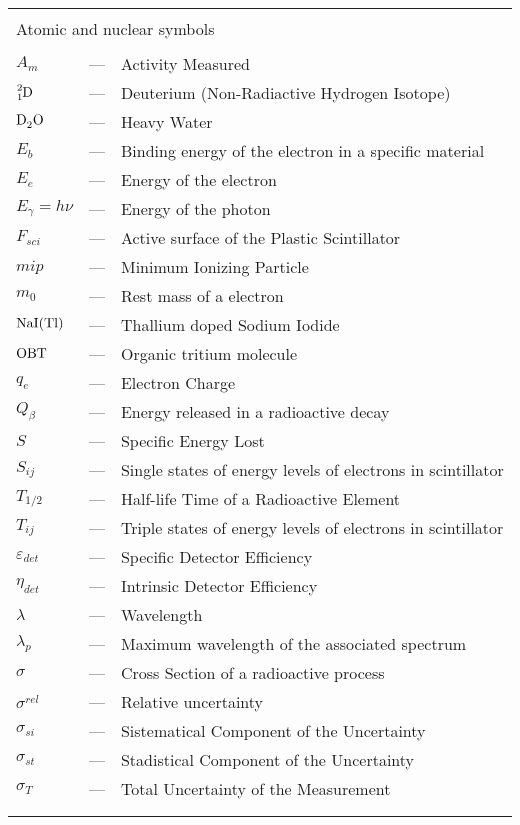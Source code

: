 \begin{longtable}{p{25mm} c p{120mm} }
\\
\\
\multicolumn{3}{l}{Atomic and nuclear symbols}\\
\\
$A_{m}$ & --- & Activity Measured\\
$\ce{^{2}_{1}D}$ & --- & Deuterium (Non-Radiactive Hydrogen Isotope)\\
$\ce{D_{2}O}$ & --- & Heavy Water\\
$E_b$ & --- & Binding energy of the electron in a specific material\\
$E_e$ & --- & Energy of the electron\\
$E_\gamma = h\nu$ & --- & Energy of the photon\\
$F_{sci}$ & --- & Active surface of the Plastic Scintillator\\
$mip$ & --- & Minimum Ionizing Particle\\
$m_0$ & --- & Rest mass of a electron\\
$\ce{NaI(Tl)}$ & --- & Thallium doped Sodium Iodide\\
$\ce{OBT}$ & --- & Organic tritium molecule\\
$q_{e}$ & --- & Electron Charge\\
$Q_\beta$ & --- & Energy released in a radioactive decay\\
$S$ & --- & Specific Energy Lost\\
$S_{ij}$ & --- & Single states of energy levels of electrons in scintillator\\
$T_{1/2}$ & --- & Half-life Time of a Radioactive Element\\
$T_{ij}$ & --- & Triple states of energy levels of electrons in scintillator\\
$\varepsilon_{det}$ & --- & Specific Detector Efficiency\\
$\eta_{det}$ & --- & Intrinsic Detector Efficiency\\
$\lambda$ & --- & Wavelength\\
$\lambda_p$ & --- & Maximum wavelength of the
\newline associated spectrum\\
$\sigma$ & --- & Cross Section of a radioactive process\\
$\sigma^{rel}$ & --- & Relative uncertainty\\
$\sigma_{si}$ & --- & Sistematical Component of the Uncertainty\\
$\sigma_{st}$ & --- & Stadistical Component of the Uncertainty\\
$\sigma_{T}$ & --- & Total Uncertainty of the Measurement\\
\\
\\


\end{longtable}
